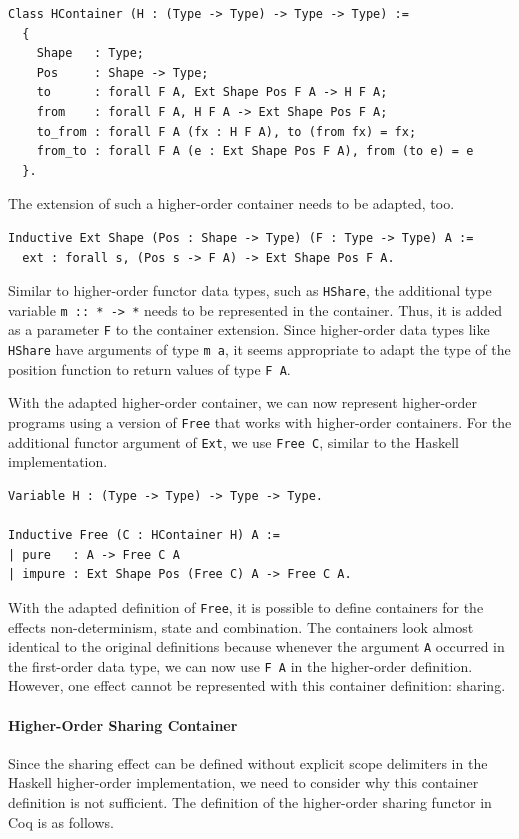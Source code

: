 \documentclass[a4paper, 11pt, fleqn, twoside, abstract=on]{scrreprt}
\newcommand{\hinl}[1]{\texttt{#1}}
\newcommand{\cinl}[1]{\texttt{#1}}
\begin{document}
\begin{verbatim}
Class HContainer (H : (Type -> Type) -> Type -> Type) :=
  {
    Shape   : Type;
    Pos     : Shape -> Type;
    to      : forall F A, Ext Shape Pos F A -> H F A;
    from    : forall F A, H F A -> Ext Shape Pos F A;
    to_from : forall F A (fx : H F A), to (from fx) = fx;
    from_to : forall F A (e : Ext Shape Pos F A), from (to e) = e
  }.
\end{verbatim}
\noindent
The extension of such a higher-order container needs to be adapted, too.

\begin{verbatim}
Inductive Ext Shape (Pos : Shape -> Type) (F : Type -> Type) A := 
  ext : forall s, (Pos s -> F A) -> Ext Shape Pos F A.
\end{verbatim}
\noindent
Similar to higher-order functor data types, such as \hinl{HShare}, the additional type variable \hinl{m :: * -> *} needs to be represented in the container.
Thus, it is added as a parameter \cinl{F} to the container extension.
Since higher-order data types like \hinl{HShare} have arguments of type \hinl{m a}, it seems appropriate to adapt the type of the position function to return values of type \cinl{F A}.

With the adapted higher-order container, we can now represent higher-order programs using a version of \cinl{Free} that works with higher-order containers.
For the additional functor argument of \cinl{Ext}, we use \cinl{Free C}, similar to the Haskell implementation.

\begin{verbatim}
Variable H : (Type -> Type) -> Type -> Type.

Inductive Free (C : HContainer H) A :=
| pure   : A -> Free C A
| impure : Ext Shape Pos (Free C) A -> Free C A.
\end{verbatim}

With the adapted definition of \cinl{Free}, it is possible to define containers for the effects non-determinism, state and combination.
The containers look almost identical to the original definitions because whenever the argument \cinl{A} occurred in the first-order data type, we can now use \cinl{F A} in the higher-order definition.
However, one effect cannot be represented with this container definition: sharing.

\paragraph{Higher-Order Sharing Container}
Since the sharing effect can be defined without explicit scope delimiters in the Haskell higher-order implementation, we need to consider why this container definition is not sufficient.
The definition of the higher-order sharing functor in Coq is as follows.
\end{document}

